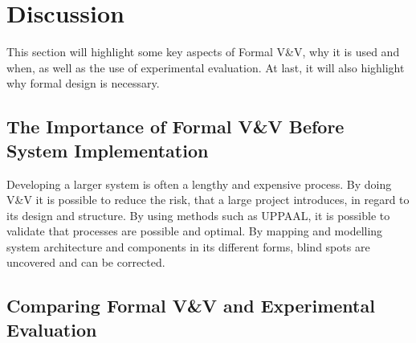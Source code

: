 \section{Discussion}
\label{sec:discussion}

This section will highlight some key aspects of Formal V\&V, why it is used and when, as well as the use of experimental evaluation. At last, it will also highlight why formal design is necessary.

\subsection{The Importance of Formal V\&V Before System Implementation}

Developing a larger system is often a lengthy and expensive process. By doing V\&V it is possible to reduce the risk, that a large project introduces, in regard to its design and structure. 
By using methods such as UPPAAL, it is possible to validate that processes are possible and optimal. By mapping and modelling system architecture and components in its different forms, blind spots are uncovered and can be corrected.


\subsection{Comparing Formal V\&V and Experimental Evaluation}

